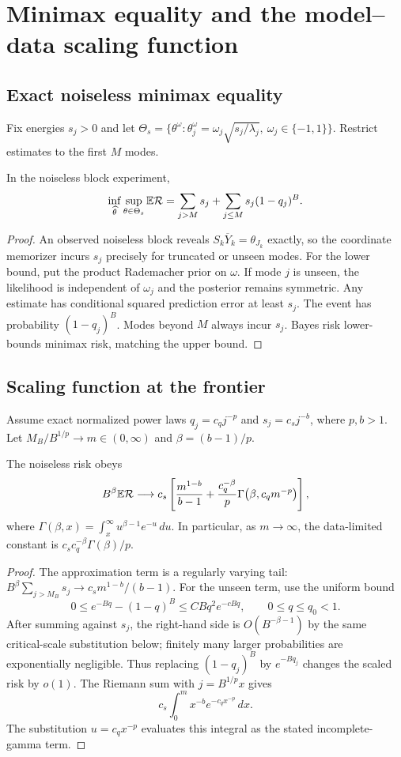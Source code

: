 \section{Minimax equality and the model--data scaling function}

\subsection{Exact noiseless minimax equality}
Fix energies $s_j>0$ and let
$\Theta_s=\{\theta^\omega:\theta_j^\omega=\omega_j\sqrt{s_j/\lambda_j},
\ \omega_j\in\{-1,1\}\}$. Restrict estimates to the first $M$ modes.

\begin{theorem}
In the noiseless block experiment,
\[
\inf_{\widehat\theta}\sup_{\theta\in\Theta_s}\mathbb{E}\mathcal{R}
=\sum_{j>M}s_j+\sum_{j\le M}s_j(1-q_j)^B.
\]
\end{theorem}

\begin{proof}
An observed noiseless block reveals $S_k\overline Y_k=\theta_{J_k}$ exactly, so
the coordinate memorizer incurs $s_j$ precisely for truncated or unseen modes.
For the lower bound, put the product Rademacher prior on $\omega$. If mode $j$
is unseen, the likelihood is independent of $\omega_j$ and the posterior
remains symmetric. Any estimate has conditional squared prediction error at
least $s_j$. The event has probability $(1-q_j)^B$. Modes beyond $M$ always
incur $s_j$. Bayes risk lower-bounds minimax risk, matching the upper bound.
\end{proof}

\subsection{Scaling function at the frontier}
Assume exact normalized power laws
$q_j=c_qj^{-p}$ and $s_j=c_sj^{-b}$, where $p,b>1$. Let
$M_B/ B^{1/p}\to m\in(0,\infty)$ and $\beta=(b-1)/p$.

\begin{proposition}
The noiseless risk obeys
\[
B^\beta\mathbb{E}\mathcal{R}\longrightarrow
c_s\left[\frac{m^{1-b}}{b-1}
+\frac{c_q^{-\beta}}{p}
\Gamma\!\left(\beta,c_qm^{-p}\right)\right],
\]
where $\Gamma(\beta,x)=\int_x^\infty u^{\beta-1}e^{-u}\,du$.
In particular, as $m\to\infty$, the data-limited constant is
$c_sc_q^{-\beta}\Gamma(\beta)/p$.
\end{proposition}

\begin{proof}
The approximation term is a regularly varying tail:
$B^\beta\sum_{j>M_B}s_j\to c_sm^{1-b}/(b-1)$. For the unseen term, use the uniform bound
\[
0\le e^{-Bq}-(1-q)^B\le C Bq^2e^{-cBq},\qquad 0\le q\le q_0<1.
\]
After summing against $s_j$, the right-hand side is $O(B^{-\beta-1})$ by the
same critical-scale substitution below; finitely many larger probabilities
are exponentially negligible. Thus replacing $(1-q_j)^B$ by $e^{-Bq_j}$
changes the scaled risk by $o(1)$. The Riemann sum with $j=B^{1/p}x$ gives
\[
c_s\int_0^m x^{-b}e^{-c_qx^{-p}}\,dx.
\]
The substitution $u=c_qx^{-p}$ evaluates this integral as the stated
incomplete-gamma term.
\end{proof}
